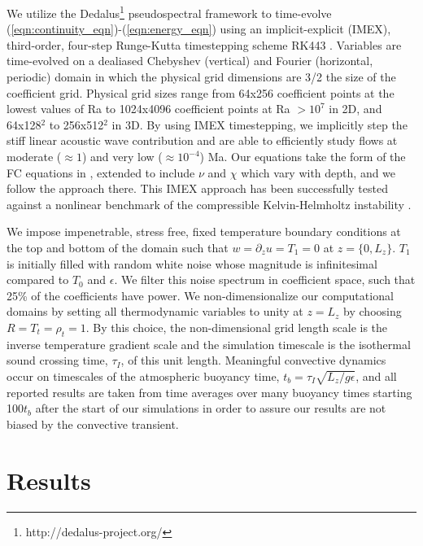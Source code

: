 \documentclass[aps, prl, twocolumn, nofootinbib, groupedaddress, amsfonts, amssymb, amsmath]{revtex4-1}
\begin{document}
We utilize the 
Dedalus\footnote{http://dedalus-project.org/} \cite{burns&all2016} 
pseudospectral framework to time-evolve  
(\ref{eqn:continuity_eqn})-(\ref{eqn:energy_eqn}) 
using an implicit-explicit (IMEX), third-order, four-step 
Runge-Kutta timestepping scheme RK443 \cite{ascher&all1997}.  
Variables are time-evolved on a dealiased Chebyshev (vertical)
and Fourier (horizontal, periodic) domain in which the
physical grid dimensions are 3/2 the size of the coefficient grid.  
Physical grid sizes range from
64x256 coefficient points at the lowest values of 
Ra to 1024x4096 coefficient points at Ra $> 10^{7}$ in 2D,
and 64x128$^2$ to  256x512$^2$ in 3D. 
By using IMEX timestepping, we implicitly step the 
stiff linear acoustic wave contribution and are able to
efficiently study flows at moderate ($\approx 1$) 
and very low ($\approx 10^{-4}$) Ma.  Our equations take the form
of the FC equations in \cite{lecoanet&all2014}, extended to include
$\nu$ and $\chi$ which vary with depth, and we follow the approach there.
This IMEX approach has been successfully 
tested against a nonlinear benchmark  of the compressible 
Kelvin-Helmholtz instability \cite{Lecoanet_et_al_2016_KH}.

We impose impenetrable, stress free, fixed temperature boundary conditions at
the top and bottom of the domain such that 
$w = \partial_z u = T_1 = 0$ at $z = \{0, L_z\}$. 
$T_1$ is initially filled with
random white noise whose magnitude is infinitesimal
compared to $T_0$ and $\epsilon$.
We filter this noise spectrum in coefficient space, 
such that 25\% of the coefficients
have power. We non-dimensionalize our computational domains by setting
all thermodynamic variables to unity at $z = L_z$ by choosing
$R = T_t = \rho_t = 1$.  By this choice, the non-dimensional
grid length scale is the inverse temperature gradient scale and the 
simulation timescale is the isothermal sound crossing time, 
$\tau_I$, of this unit length.
Meaningful convective dynamics occur on 
timescales of the atmospheric buoyancy time,
$t_b = \tau_I \sqrt{L_z/g\epsilon}$, 
and all reported results are taken from time averages
over many buoyancy times starting 100$t_b$ 
after the start of our simulations in order to
assure our results are not biased by the convective transient.

\section{Results}
\label{sec:results}
\end{document}
